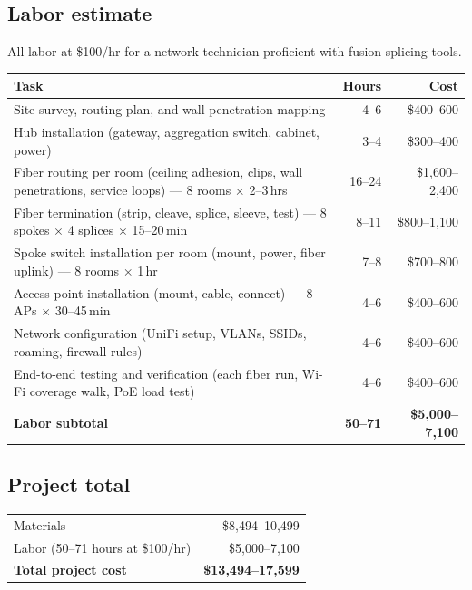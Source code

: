 \documentclass[10pt, letterpaper]{article}
\begin{document}
\subsection{Labor estimate}

All labor at \$100/hr for a network technician proficient with fusion splicing tools.

\begin{metricbox}
\begin{tabularx}{\textwidth}{@{} X r r @{}}
\toprule
\textbf{Task} & \textbf{Hours} & \textbf{Cost} \\
\midrule
Site survey, routing plan, and wall-penetration mapping & 4--6 & \$400--600 \\
Hub installation (gateway, aggregation switch, cabinet, power) & 3--4 & \$300--400 \\
Fiber routing per room (ceiling adhesion, clips, wall penetrations, service loops) --- 8 rooms $\times$ 2--3\,hrs & 16--24 & \$1,600--2,400 \\
Fiber termination (strip, cleave, splice, sleeve, test) --- 8 spokes $\times$ 4 splices $\times$ 15--20\,min & 8--11 & \$800--1,100 \\
Spoke switch installation per room (mount, power, fiber uplink) --- 8 rooms $\times$ 1\,hr & 7--8 & \$700--800 \\
Access point installation (mount, cable, connect) --- 8 APs $\times$ 30--45\,min & 4--6 & \$400--600 \\
Network configuration (UniFi setup, VLANs, SSIDs, roaming, firewall rules) & 4--6 & \$400--600 \\
End-to-end testing and verification (each fiber run, Wi-Fi coverage walk, PoE load test) & 4--6 & \$400--600 \\
\midrule
\textbf{Labor subtotal} & \textbf{50--71} & \textbf{\$5,000--7,100} \\
\bottomrule
\end{tabularx}
\end{metricbox}

\subsection{Project total}

\begin{metricbox}
\begin{tabularx}{\textwidth}{@{} X r @{}}
\toprule
Materials & \$8,494--10,499 \\
Labor (50--71 hours at \$100/hr) & \$5,000--7,100 \\
\midrule
\textbf{Total project cost} & \textbf{\$13,494--17,599} \\
\bottomrule
\end{tabularx}
\end{metricbox}
\end{document}
